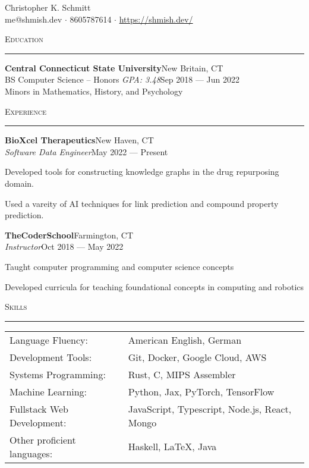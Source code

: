 \documentclass[a4paper]{article}
\newenvironment{cvsection}[1]{%
    \noindent
    \textsc{#1}
    \vspace{4pt}
    \hrule
    \vspace{4pt}
}{\vspace{2pt}}
\newcommand{\school}[6] {
    \noindent\textbf{#1}\hfill#2\\
    \noindent#3 \textit{GPA: #4}\hfill#5\\
    \noindent\vspace{8pt}Minors in #6\\
}
\newcommand{\employer}[5] {
    \noindent\textbf{#1}\hfill#2\\
    \noindent\textit{#3}\hfill#4
    \begin{compactitem}
        #5
    \end{compactitem}
    \vspace{16pt}
}
\begin{document}
    \begin{center}
        {\huge Christopher K. Schmitt}\\
        \vspace{8pt}
        me@shmish.dev $\cdot$ 8605787614 $\cdot$ \href{https://shmish.dev/}{https://shmish.dev/}
    \end{center}
  
    \begin{cvsection}{Education}
        \school{Central Connecticut State University}{New Britain, CT}{BS Computer Science -- Honors}{3.48}{Sep 2018 --- Jun 2022}{Mathematics, History, and Psychology}
    \end{cvsection}

    \begin{cvsection}{Experience}
        \employer{BioXcel Therapeutics}{New Haven, CT}{Software Data Engineer}{May 2022 --- Present}{
            \item Developed tools for constructing knowledge graphs in the drug repurposing domain.
            \item Used a vareity of AI techniques for link prediction and compound property prediction. 
        }

        \employer{TheCoderSchool}{Farmington, CT}{Instructor}{Oct 2018 --- May 2022}{
            \item Taught computer programming and computer science concepts
            \item Developed curricula for teaching foundational concepts in computing and robotics
        }
    \end{cvsection}

    \begin{cvsection}{Skills}
        \begin{tabular}{ l l }
            Language Fluency:           & American English, German\\
            Development Tools:          & Git, Docker, Google Cloud, AWS\\
            Systems Programming:        & Rust, C, MIPS Assembler\\
            Machine Learning:           & Python, Jax, PyTorch, TensorFlow\\
            Fullstack Web Development:  & JavaScript, Typescript, Node.js, React, Mongo\\
            Other proficient languages: & Haskell, LaTeX, Java\\
        \end{tabular}
        \vspace{16pt}
    \end{cvsection}
\end{document}
